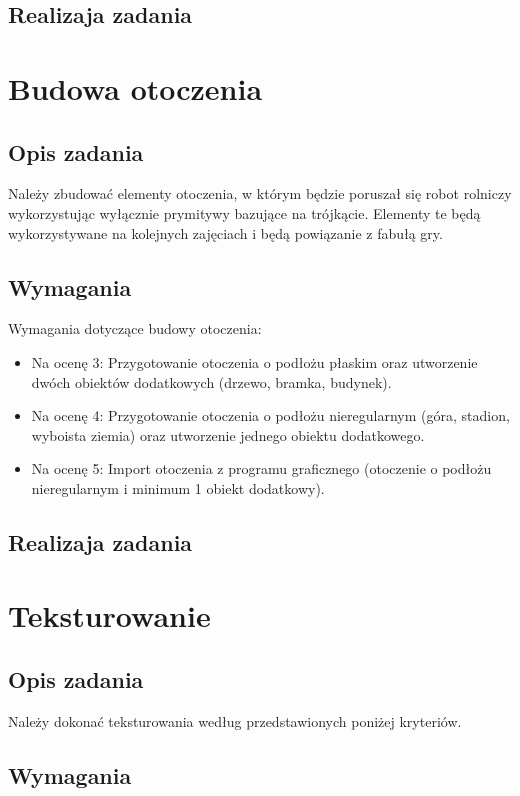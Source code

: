 \documentclass[a4paper, 12pt]{article}
\begin{document}
\subsection{Realizaja zadania}

\section{Budowa otoczenia}
\subsection{Opis zadania}
Należy zbudować elementy otoczenia, w którym będzie poruszał się robot rolniczy wykorzystując wyłącznie prymitywy bazujące na trójkącie. Elementy te będą wykorzystywane na kolejnych zajęciach i będą powiązanie z fabułą gry.
\subsection{Wymagania}
Wymagania dotyczące budowy otoczenia:
\begin{itemize}
\item Na ocenę 3:
Przygotowanie otoczenia o podłożu płaskim oraz utworzenie dwóch obiektów dodatkowych (drzewo, bramka, budynek).
\item Na ocenę 4:
Przygotowanie otoczenia o podłożu nieregularnym (góra, stadion, wyboista ziemia) oraz utworzenie jednego obiektu dodatkowego.
\item Na ocenę 5:
Import otoczenia z programu graficznego (otoczenie o podłożu nieregularnym i minimum 1 obiekt dodatkowy).
\end{itemize}

\subsection{Realizaja zadania}

\section{Teksturowanie}
\subsection{Opis zadania}

Należy dokonać teksturowania według przedstawionych poniżej kryteriów.
\subsection{Wymagania}
\end{document}
